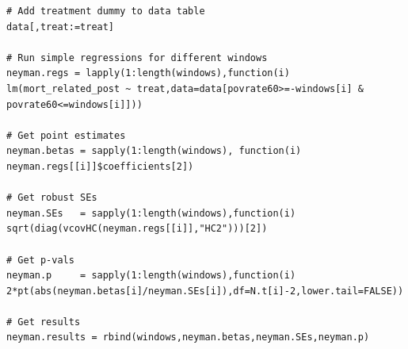 \documentclass[12pt]{article}
\begin{document}
\begin{verbatim}
# Add treatment dummy to data table
data[,treat:=treat]

# Run simple regressions for different windows
neyman.regs = lapply(1:length(windows),function(i) lm(mort_related_post ~ treat,data=data[povrate60>=-windows[i] & povrate60<=windows[i]]))

# Get point estimates
neyman.betas = sapply(1:length(windows), function(i) neyman.regs[[i]]$coefficients[2])

# Get robust SEs
neyman.SEs   = sapply(1:length(windows),function(i) sqrt(diag(vcovHC(neyman.regs[[i]],"HC2")))[2])

# Get p-vals
neyman.p     = sapply(1:length(windows),function(i) 2*pt(abs(neyman.betas[i]/neyman.SEs[i]),df=N.t[i]-2,lower.tail=FALSE))

# Get results
neyman.results = rbind(windows,neyman.betas,neyman.SEs,neyman.p)
\end{verbatim}
\end{document}
